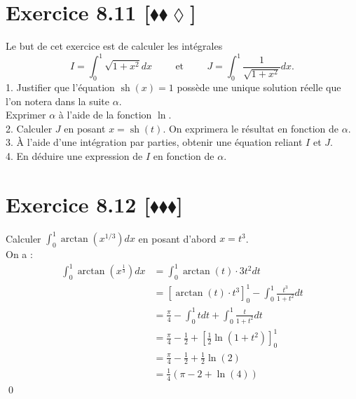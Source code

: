 \documentclass[10pt]{article}
\DeclareMathOperator{\sh}{sh}
\begin{document}

\section*{Exercice 8.11 [$\blacklozenge\blacklozenge\lozenge$]}
\begin{tcolorbox}[enhanced, width=7in, center, size=fbox, fontupper=\large, drop shadow southwest]
    Le but de cet exercice est de calculer les intégrales
    \begin{equation*}
        I = \int_0^1{\sqrt{1+x^2}dx} \hspace{1cm} \text{et} \hspace{1cm} J=\int_0^1{\frac{1}{\sqrt{1+x^2}}dx}.
    \end{equation*}
    1. Justifier que l'équation $\sh(x)=1$ possède une unique solution réelle que l'on notera dans la suite $\alpha$.\\
    Exprimer $\alpha$ à l'aide de la fonction $\ln$.\\
    2. Calculer $J$ en posant $x=\sh(t)$. On exprimera le résultat en fonction de $\alpha$.\\
    3. À l'aide d'une intégration par parties, obtenir une équation reliant $I$ et $J$.\\
    4. En déduire une expression de $I$ en fonction de $\alpha$.
\end{tcolorbox}


\section*{Exercice 8.12 [$\blacklozenge\blacklozenge\blacklozenge$]}
\begin{tcolorbox}[enhanced, width=7in, center, size=fbox, fontupper=\large, drop shadow southwest]
    Calculer $\int_0^1{\arctan(x^{1/3})dx}$ en posant d'abord $x=t^3$.\\
    On a :
    \begin{align*}
        \int_0^1{\arctan(x^{\frac{1}{3}})dx}&=\int_0^1{\arctan(t)\cdot3t^2dt}\\
        &=\left[\arctan(t)\cdot t^3\right]_0^1 - \int_0^1{\frac{t^3}{1+t^2} dt}\\
        &=\frac{\pi}{4} - \int_0^1{tdt}+\int_0^1{\frac{t}{1+t^2}dt}\\
        &=\frac{\pi}{4} - \frac{1}{2} + \left[\frac{1}{2}\ln(1+t^2)\right]_0^1\\
        &=\frac{\pi}{4} - \frac{1}{2} + \frac{1}{2}\ln(2)\\
        &=\frac{1}{4}\left(\pi - 2 + \ln(4)\right)
    \end{align*}
    \qed
\end{tcolorbox}
\end{document}
